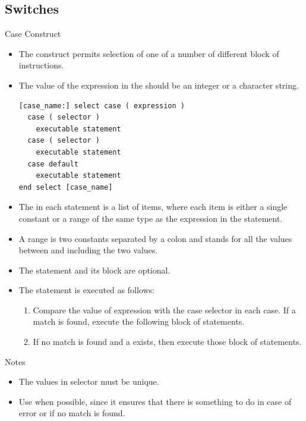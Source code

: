 \documentclass[10pt,t]{beamer}
\begin{document}
\subsection{Switches}
\begin{frame}{Case Construct}
  \begin{itemize}
    \item The  construct permits selection of one of a number of different block of instructions.
    \item The value of the expression in the  should be an integer or a character string.
      \begin{lstlisting}[language={[90]Fortran},basicstyle=\fontsize{6}{7}\selectfont\ttfamily]
[case_name:] select case ( expression )
  case ( selector )
    executable statement
  case ( selector )
    executable statement
  case default
    executable statement
end select [case_name]
      \end{lstlisting}
    \item The  in each  statement is a list of items, where each item is either a single constant or a range of the same type as the expression in the  statement.
    \item A range is two constants separated by a colon and stands for all the values between and including the two values. 
    \item The  statement and its block are optional.
    \item The  statement is executed as follows:
    \begin{enumerate}
      \item Compare the value of expression with the case selector in each case. If a match is found, execute the following block of statements.
      \item If no match is found and a  exists, then execute those block of statements.
    \end{enumerate}
  \end{itemize}
  \begin{ablock}{Notes}
    \begin{itemize}
      \item The values in selector must be unique.
      \item Use  when possible, since it ensures that there is something to do in case of error or if no match is found.

\end{itemize}
\end{ablock}
\end{frame}
\end{document}
